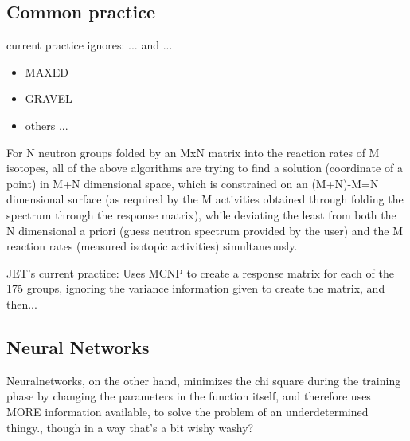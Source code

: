 \documentclass[a4paper, 12pt]{article}
\begin{document}
	\subsection{Common practice}
    current practice ignores: ... and ...
    \begin{itemize}
        \item MAXED
        \item GRAVEL
        \item others ...
    \end{itemize}
    For N neutron groups folded by an MxN matrix into the reaction rates of M isotopes,
    all of the above algorithms are trying to find a solution (coordinate of a point) in M+N dimensional space, 
    which is constrained on an (M+N)-M=N dimensional surface (as required by the M activities obtained through folding the spectrum through the response matrix),
    while deviating the least from both the N dimensional a priori (guess neutron spectrum provided by the user) and the M reaction rates (measured isotopic activities) simultaneously.
    
    JET's current practice:
    Uses MCNP to create a response matrix for each of the 175 groups, ignoring the variance information given to create the matrix, and then...

    \subsection{Neural Networks} \label{Neural Network Theory}
    Neuralnetworks, on the other hand, minimizes the chi square during the training phase by changing the parameters in the function itself, and therefore uses MORE information available, to solve the problem of an underdetermined thingy., though in a way that's a bit wishy washy?
\end{document}
